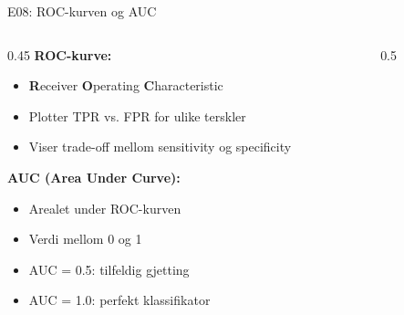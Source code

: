 \documentclass[aspectratio=169, 10pt]{beamer}
\begin{document}
\begin{frame}{E08: ROC-kurven og AUC}
    
    \begin{columns}
        \begin{column}{0.45\textwidth}
            \textbf{ROC-kurve:}
            \begin{itemize}
                \item \textbf{R}eceiver \textbf{O}perating \textbf{C}haracteristic
                \item Plotter TPR vs. FPR for ulike terskler
                \item Viser trade-off mellom sensitivity og specificity
            \end{itemize}
            
            \vspace{3mm}
            
            \textbf{AUC (Area Under Curve):}
            \begin{itemize}
                \item Arealet under ROC-kurven
                \item Verdi mellom 0 og 1
                \item AUC = 0.5: tilfeldig gjetting
                \item AUC = 1.0: perfekt klassifikator
            \end{itemize}
        \end{column}
        
        \begin{column}{0.5\textwidth}
            \begin{center}
\end{center}
\end{column}
\end{columns}
\end{frame}
\end{document}
